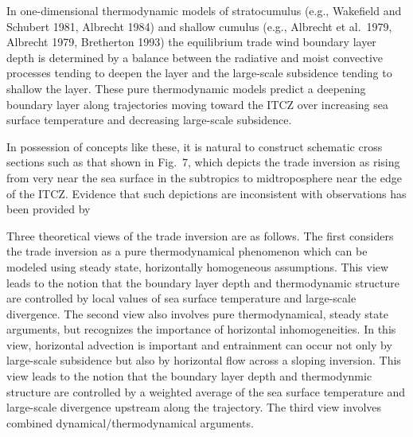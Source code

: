     In one-dimensional thermodynamic models of stratocumulus (e.g., Wakefield
and Schubert 1981, Albrecht 1984) and shallow cumulus (e.g., Albrecht et al.\
1979, Albrecht 1979, Bretherton 1993) the equilibrium trade wind boundary
layer depth is determined by a balance between the radiative and moist
convective processes tending to deepen the layer and the large-scale
subsidence tending to shallow the layer.  These pure thermodynamic models
predict a deepening boundary layer along trajectories moving toward the ITCZ
over increasing sea surface temperature and decreasing large-scale subsidence.

     In possession of concepts like these, it is natural to construct
schematic cross sections such as that shown in Fig.~7, which depicts the trade
inversion as rising from very near the sea surface in the subtropics to
midtroposphere  near the edge of the ITCZ.  Evidence that such depictions are
inconsistent with observations has been provided by

      Three theoretical views of the trade inversion are as follows.  The
first considers the trade inversion as a pure thermodynamical phenomenon which
can be modeled using steady state, horizontally homogeneous assumptions.  This
view leads to the notion that the boundary layer depth and thermodynamic
structure are controlled by local values of sea surface temperature and
large-scale divergence.  The second view also involves pure thermodynamical,
steady state arguments, but recognizes the importance of horizontal
inhomogeneities.  In this view, horizontal advection is important and
entrainment can occur not only by large-scale subsidence but also by
horizontal flow across a sloping inversion.  This view leads to the notion
that the boundary layer depth and thermodynmic structure are controlled by a
weighted average of the sea surface temperature and large-scale divergence
upstream along the trajectory. The third view involves combined
dynamical/thermodynamical arguments.



